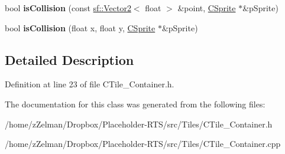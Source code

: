 \begin{DoxyCompactItemize}
\item 
\hypertarget{classCTile__Container_a4195d75fcc4790946b19ea82fc693a1c}{bool {\bfseries is\-Collision} (const \hyperlink{classsf_1_1Vector2}{sf\-::\-Vector2}$<$ float $>$ \&point, \hyperlink{classCSprite}{C\-Sprite} $\ast$\&p\-Sprite)}\label{classCTile__Container_a4195d75fcc4790946b19ea82fc693a1c}

\item 
\hypertarget{classCTile__Container_a3c8b4ccbb9afaaa9462a11962b6e2dbd}{bool {\bfseries is\-Collision} (float x, float y, \hyperlink{classCSprite}{C\-Sprite} $\ast$\&p\-Sprite)}\label{classCTile__Container_a3c8b4ccbb9afaaa9462a11962b6e2dbd}

\end{DoxyCompactItemize}


\subsection{Detailed Description}


Definition at line 23 of file C\-Tile\-\_\-\-Container.\-h.



The documentation for this class was generated from the following files\-:\begin{DoxyCompactItemize}
\item 
/home/z\-Zelman/\-Dropbox/\-Placeholder-\/\-R\-T\-S/src/\-Tiles/C\-Tile\-\_\-\-Container.\-h\item 
/home/z\-Zelman/\-Dropbox/\-Placeholder-\/\-R\-T\-S/src/\-Tiles/C\-Tile\-\_\-\-Container.\-cpp\end{DoxyCompactItemize}
